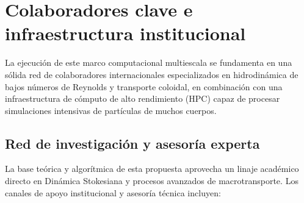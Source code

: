 \section{Colaboradores clave e infraestructura institucional}
\label{sec:collaborators}

La ejecución de este marco computacional multiescala se fundamenta en una sólida red de colaboradores internacionales especializados en hidrodinámica de bajos números de Reynolds y transporte coloidal, en combinación con una infraestructura de cómputo de alto rendimiento (HPC) capaz de procesar simulaciones intensivas de partículas de muchos cuerpos.

\subsection{Red de investigación y asesoría experta}
La base teórica y algorítmica de esta propuesta aprovecha un linaje académico directo en Dinámica Stokesiana y procesos avanzados de macrotransporte. Los canales de apoyo institucional y asesoría técnica incluyen:
